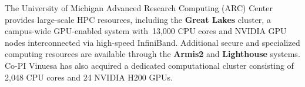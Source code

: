 
The University of Michigan Advanced Research Computing (ARC) Center
provides large-scale HPC resources, including the {\bf Great Lakes} cluster,
a campus-wide GPU-enabled system with~13,000 CPU cores and
NVIDIA GPU nodes interconnected via high-speed InfiniBand.
Additional secure and specialized computing resources are available
through the {\bf Armis2} and {\bf Lighthouse} systems. Co-PI Vinuesa has also
acquired a dedicated computational cluster consisting of
2,048 CPU cores and 24 NVIDIA H200 GPUs.



